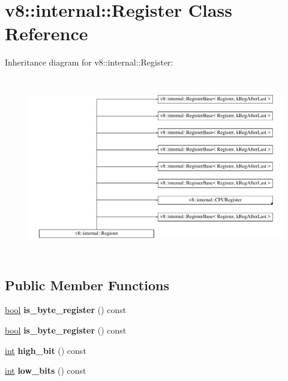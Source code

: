 \hypertarget{classv8_1_1internal_1_1Register}{}\section{v8\+:\+:internal\+:\+:Register Class Reference}
\label{classv8_1_1internal_1_1Register}
Inheritance diagram for v8\+:\+:internal\+:\+:Register\+:\begin{figure}[H]
\begin{center}
\leavevmode
\includegraphics[height=7.875000cm]{classv8_1_1internal_1_1Register}
\end{center}
\end{figure}
\subsection*{Public Member Functions}
\begin{DoxyCompactItemize}
\item 
\mbox{\label{classv8_1_1internal_1_1Register_aa44ca9ea4626f46cd5e75d9fa4545d8a}} 
\mbox{\hyperlink{classbool}{bool}} {\bfseries is\+\_\+byte\+\_\+register} () const
\item 
\mbox{\label{classv8_1_1internal_1_1Register_aa44ca9ea4626f46cd5e75d9fa4545d8a}} 
\mbox{\hyperlink{classbool}{bool}} {\bfseries is\+\_\+byte\+\_\+register} () const
\item 
\mbox{\label{classv8_1_1internal_1_1Register_a2c8ac1a1994fba9a4c2128bc94c9b925}} 
\mbox{\hyperlink{classint}{int}} {\bfseries high\+\_\+bit} () const
\item 
\mbox{\label{classv8_1_1internal_1_1Register_acb1bd74143e970f9300bb85ef69e2ac3}} 
\mbox{\hyperlink{classint}{int}} {\bfseries low\+\_\+bits} () const
\end{DoxyCompactItemize}
